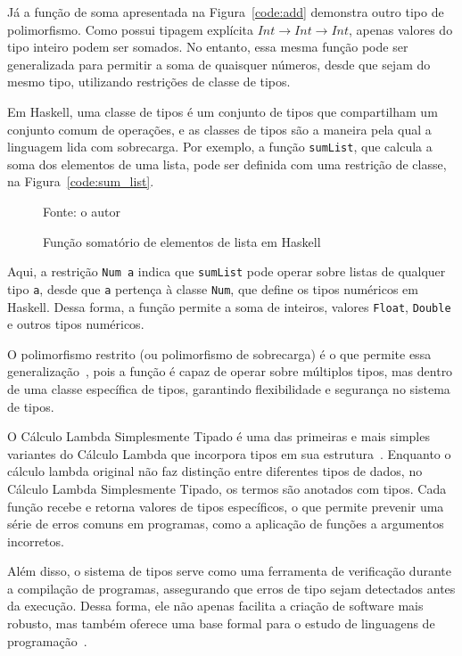 Já a função de soma apresentada na Figura~\ref{code:add} demonstra outro tipo de polimorfismo.
Como possui tipagem explícita $Int \rightarrow Int \rightarrow Int$, apenas valores do tipo inteiro podem ser somados.
No entanto, essa mesma função pode ser generalizada para permitir a soma de quaisquer números, desde que sejam do mesmo tipo, utilizando restrições de classe de tipos.

Em Haskell, uma classe de tipos é um conjunto de tipos que compartilham um conjunto comum de operações, e as classes de tipos são a maneira pela qual a linguagem lida com sobrecarga.
Por exemplo, a função \texttt{sumList}, que calcula a soma dos elementos de uma lista, pode ser definida com uma restrição de classe, na Figura~\ref{code:sum_list}.

\begin{figure}
  \caption{Função somatório de elementos de lista em Haskell}
  \small{Fonte: o autor}
  
\end{figure}

Aqui, a restrição \texttt{Num a} indica que \texttt{sumList} pode operar sobre listas de qualquer tipo \texttt{a}, desde que \texttt{a} pertença à classe \texttt{Num}, que define os tipos numéricos em Haskell.
Dessa forma, a função permite a soma de inteiros, valores \texttt{Float}, \texttt{Double} e outros tipos numéricos.

O polimorfismo restrito (ou polimorfismo de sobrecarga) é o que permite essa generalização~\cite{PIERCE2002}, pois a função é capaz de operar sobre múltiplos tipos, mas dentro de uma classe específica de tipos, garantindo flexibilidade e segurança no sistema de tipos.

O Cálculo Lambda Simplesmente Tipado é uma das primeiras e mais simples variantes do Cálculo Lambda que incorpora tipos em sua estrutura~\cite{CHURCH1940}.
Enquanto o cálculo lambda original não faz distinção entre diferentes tipos de dados, no Cálculo Lambda Simplesmente Tipado, os termos são anotados com tipos.
Cada função recebe e retorna valores de tipos específicos, o que permite prevenir uma série de erros comuns em programas, como a aplicação de funções a argumentos incorretos.

Além disso, o sistema de tipos serve como uma ferramenta de verificação durante a compilação de programas, assegurando que erros de tipo sejam detectados antes da execução.
Dessa forma, ele não apenas facilita a criação de software mais robusto, mas também oferece uma base formal para o estudo de linguagens de programação~\cite{PIERCE2002}.

